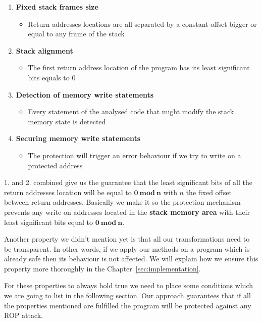 \documentclass[11pt]{sdm}
\begin{document}
\begin{enumerate}
	\item \textbf{Fixed stack frames size}
		\begin{itemize}
			\item Return addresses locations are all separated by a constant offset bigger or equal to any frame of the stack
		\end{itemize}
	\item \textbf{Stack alignment}
		\begin{itemize}
			\item The first return address location of the program has its least significant bits equals to 0
		\end{itemize}
	\item \textbf{Detection of memory write statements}
		\begin{itemize}
			\item Every statement of the analysed code that might modify the stack memory state is detected
		\end{itemize}
	\item \textbf{Securing memory write statements}
		\begin{itemize}
			\item The protection will trigger an error behaviour if we try to write on a protected address
		\end{itemize}
\end{enumerate}

1. and 2. combined give us the guarantee that the least significant bits of all the return addresses location will be equal to $\mathbf{0~mod~n}$ with $n$ the fixed offset between return addresses.
Basically we make it so the protection mechanism prevents any write on addresses located in the \textbf{stack memory area} with their least significant bits equal to $\mathbf{0~mod~n}$.

\hfill \break 
Another property we didn't mention yet is that all our transformations need to be transparent. In other words, if we apply our methods on a program which is already safe then its behaviour is not affected. We will explain how we ensure this property more thoroughly in the Chapter~\ref{sec:implementation}.

\hfill \break 
For these properties to always hold true we need to place some conditions which we are going to list in the following section. Our approach guarantees that if all the properties mentioned are fulfilled the program will be protected against any ROP attack.
\end{document}
